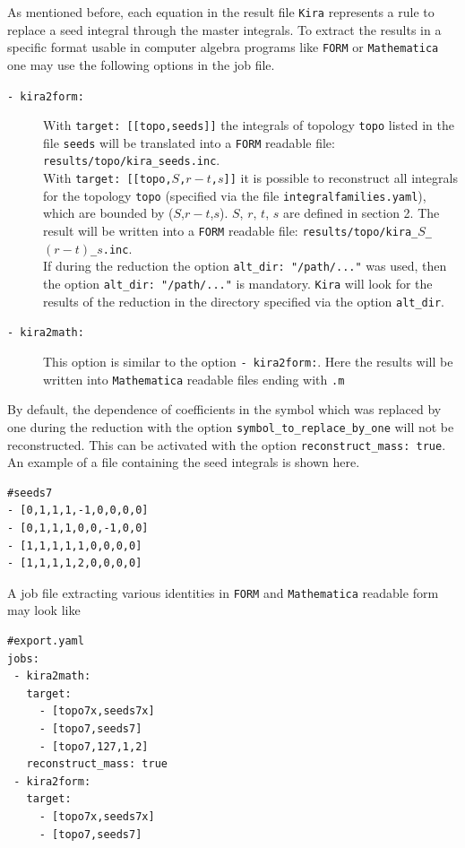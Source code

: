 \documentclass[a4paper,12pt]{scrartcl}
\newcommand*{\kira}{\texttt{Kira}}
\newcommand*{\form}{\texttt{FORM}}
\newcommand*{\mathematica}{\texttt{Mathematica}}
\begin{document}
As mentioned before, each equation in the result file \kira{}
represents a rule to replace a seed integral through the master
integrals. To extract the results in a specific format usable in
computer algebra programs like \form{} \cite{Vermaseren:2000nd} or \mathematica{}
one may use the following options in the job file.

\begin{description}
\item[\texttt{- kira2form:}]
  With \texttt{target: [[topo,seeds]]} the integrals of topology \texttt{topo} listed in the file \texttt{seeds}
  will be translated into a \form{} readable file:\\
  \texttt{results/topo/kira\_seeds.inc}.\\
  With \texttt{target: [[topo,$S$,$r-t$,$s$]]} it is possible to reconstruct all integrals for the topology \texttt{topo}
  (specified via the file \texttt{integralfamilies.yaml}), which are bounded by ($S$,$r-t$,$s$). $S$, $r$, $t$, $s$ are defined in section 2. The result will be written into a \form{} readable file:  \texttt{results/topo/kira\_$S$\_$(r-t)$\_$s$.inc}.\\
  If during the reduction the option \texttt{alt\_dir: "/path/..."}
  was used, then the option \texttt{alt\_dir: "/path/..."} is mandatory. \kira{} will look for the results of the reduction
  in the directory specified via the option \texttt{alt\_dir}.
  \item[\texttt{- kira2math:}]
  This option is similar to the option \texttt{- kira2form:}. Here the results will be written into \mathematica{} readable files ending with \texttt{.m}
\end{description}
By default, the dependence of coefficients in the symbol which was replaced by
one during the reduction with the option \texttt{symbol\_to\_replace\_by\_one}
will not be reconstructed. This can be activated with the option
\texttt{reconstruct\_mass: true}. An example of a file containing the seed
integrals is shown here.
\begin{verbatim}
#seeds7
- [0,1,1,1,-1,0,0,0,0]
- [0,1,1,1,0,0,-1,0,0]
- [1,1,1,1,1,0,0,0,0]
- [1,1,1,1,2,0,0,0,0]
\end{verbatim}
A job file extracting various identities in \form{} and \mathematica{}
readable form may look like
\begin{verbatim}
#export.yaml
jobs:
 - kira2math:
   target:
     - [topo7x,seeds7x]
     - [topo7,seeds7]
     - [topo7,127,1,2]
   reconstruct_mass: true
 - kira2form:
   target:
     - [topo7x,seeds7x]
     - [topo7,seeds7]
\end{verbatim}
\end{document}
